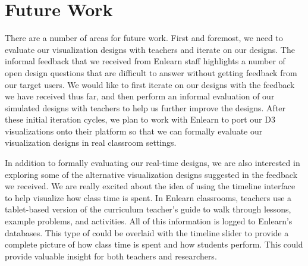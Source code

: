 \documentclass{sigchi}
\begin{document}
\section{Future Work}

There are a number of areas for future work. First and foremost, we need to evaluate our visualization designs with teachers and iterate on our designs. The informal feedback that we received from Enlearn staff highlights a number of open design questions that are difficult to answer without getting feedback from our target users. We would like to first iterate on our designs with the feedback we have received thus far, and then perform an informal evaluation of our simulated designs with teachers to help us further improve the designs. After these initial iteration cycles, we plan to work with Enlearn to port our D3 visualizations onto their platform so that we can formally evaluate our visualization designs in real classroom settings.

In addition to formally evaluating our real-time designs, we are also interested in exploring some of the alternative visualization designs suggested in the feedback we received. We are really excited about the idea of using the timeline interface to help visualize how class time is spent. In Enlearn classrooms, teachers use a tablet-based version of the curriculum teacher's guide to walk through lessons, example problems, and activities. All of this information is logged to Enlearn's databases. This type of could be overlaid with the timeline slider to provide a complete picture of how class time is spent and how students perform. This could provide valuable insight for both teachers and researchers.
\end{document}

